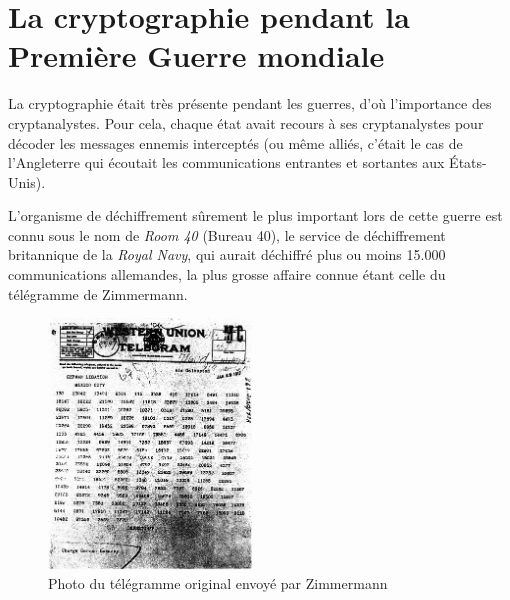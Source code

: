 \section{La cryptographie pendant la Première Guerre mondiale}
La cryptographie était très présente pendant les guerres, d'où
l'importance des cryptanalystes. Pour cela, chaque état avait recours
à ses cryptanalystes pour décoder les messages ennemis interceptés (ou
même alliés, c'était le cas de l'Angleterre qui écoutait les
communications entrantes et sortantes aux États-Unis).

L'organisme de déchiffrement sûrement le plus important lors de cette guerre
est connu sous le nom de \emph{Room 40} (Bureau 40), le service de
déchiffrement britannique de la \emph{Royal Navy}, qui aurait déchiffré
plus ou moins 15.000 communications allemandes, la plus grosse affaire
connue étant celle du télégramme de Zimmermann.
\begin{figure}
  \begin{center}
    \includegraphics[width=0.48\textwidth]{images/ZimmermanTelegram.jpg}
  \end{center}
  \caption{Photo du télégramme original envoyé par Zimmermann}
  \label{fig:Zimmerman}
  \vspace{-10pt}
\end{figure}


